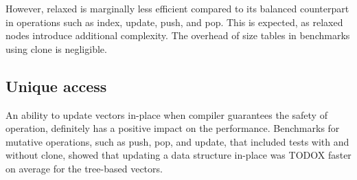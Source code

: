 
However, relaxed \rbtree{} is marginally less efficient compared to its balanced counterpart in operations such as index, update, push, and pop. This is expected, as relaxed nodes introduce additional complexity. The overhead of size tables in benchmarks using clone is negligible. 


\subsection{Unique access}


An ability to update vectors in-place when compiler guarantees the safety of operation, definitely has a positive impact on the performance. Benchmarks for mutative operations, such as push, pop, and update, that included tests with and without clone, showed that updating a data structure in-place was TODOX faster on average for the tree-based vectors. 



